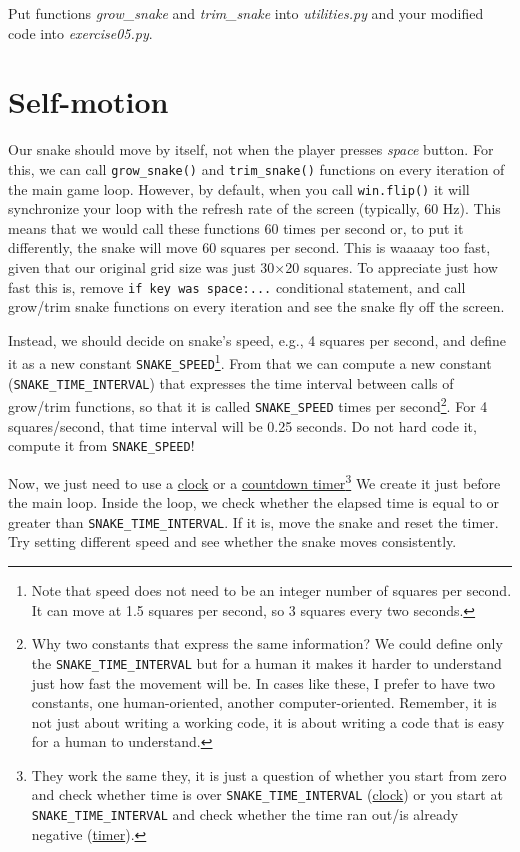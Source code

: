 \documentclass[
]{book}
\begin{document}
Put functions \emph{grow\_snake} and \emph{trim\_snake} into \emph{utilities.py} and your modified code into \emph{exercise05.py}.

\hypertarget{self-motion}{%
\section{Self-motion}\label{self-motion}}

Our snake should move by itself, not when the player presses \emph{space} button. For this, we can call \texttt{grow\_snake()} and \texttt{trim\_snake()} functions on every iteration of the main game loop. However, by default, when you call \texttt{win.flip()} it will synchronize your loop with the refresh rate of the screen (typically, 60 Hz). This means that we would call these functions 60 times per second or, to put it differently, the snake will move 60 squares per second. This is waaaay too fast, given that our original grid size was just 30×20 squares. To appreciate just how fast this is, remove \texttt{if\ key\ was\ space:...} conditional statement, and call grow/trim snake functions on every iteration and see the snake fly off the screen.

Instead, we should decide on snake's speed, e.g., 4 squares per second, and define it as a new constant \texttt{SNAKE\_SPEED}\footnote{Note that speed does not need to be an integer number of squares per second. It can move at 1.5 squares per second, so 3 squares every two seconds.}. From that we can compute a new constant (\texttt{SNAKE\_TIME\_INTERVAL}) that expresses the time interval between calls of grow/trim functions, so that it is called \texttt{SNAKE\_SPEED} times per second\footnote{Why two constants that express the same information? We could define only the \texttt{SNAKE\_TIME\_INTERVAL} but for a human it makes it harder to understand just how fast the movement will be. In cases like these, I prefer to have two constants, one human-oriented, another computer-oriented. Remember, it is not just about writing a working code, it is about writing a code that is easy for a human to understand.}. For 4 squares/second, that time interval will be 0.25 seconds. Do not hard code it, compute it from \texttt{SNAKE\_SPEED}!

Now, we just need to use a \href{https://www.psychopy.org/api/clock.html\#psychopy.clock.Clock}{clock} or a \href{https://www.psychopy.org/api/clock.html\#psychopy.clock.CountdownTimer}{countdown timer}\footnote{They work the same they, it is just a question of whether you start from zero and check whether time is over \texttt{SNAKE\_TIME\_INTERVAL} (\href{https://www.psychopy.org/api/clock.html\#psychopy.clock.Clock}{clock}) or you start at \texttt{SNAKE\_TIME\_INTERVAL} and check whether the time ran out/is already negative (\href{https://www.psychopy.org/api/clock.html\#psychopy.clock.CountdownTimer}{timer}).} We create it just before the main loop. Inside the loop, we check whether the elapsed time is equal to or greater than \texttt{SNAKE\_TIME\_INTERVAL}. If it is, move the snake and reset the timer. Try setting different speed and see whether the snake moves consistently.
\end{document}
